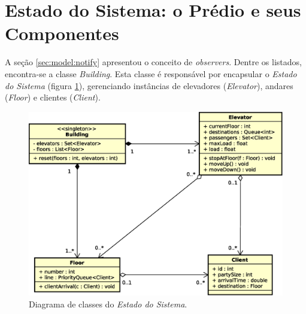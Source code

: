 \section{Estado do Sistema: o Prédio e seus Componentes}

A seção \ref{sec:model:notify} apresentou o conceito de \textit{observers}.
Dentre os listados, encontra-se a classe \textit{Building}. Esta classe é
responsável por encapsular o \textit{Estado do Sistema} (figura
\ref{fig:diagram:system}), gerenciando instâncias de elevadores
(\textit{Elevator}), andares (\textit{Floor}) e clientes (\textit{Client}).

\begin{figure}[htb!]
  \centering
  \includegraphics[scale=0.6]{img/model.eps}
  \caption{Diagrama de classes do \textit{Estado do Sistema}.}
\label{fig:diagram:system}
\end{figure}

